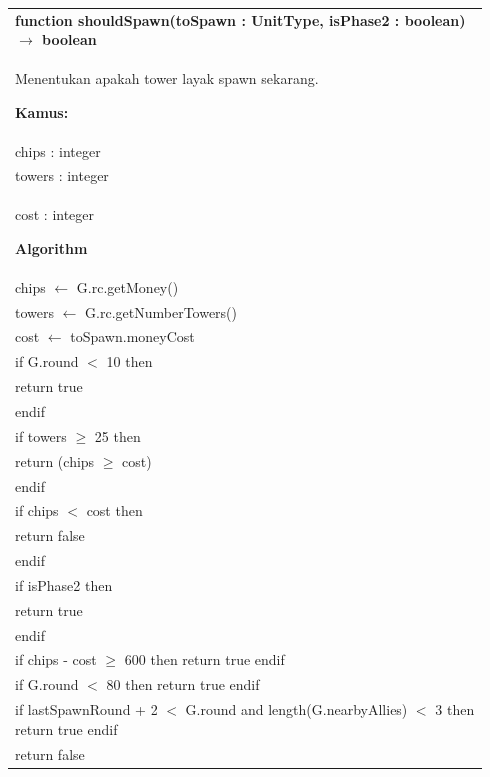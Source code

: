 \documentclass{article}
\newenvironment{pseudobox}
{
\centering
\begin{longtable}{|p{0.94\linewidth}|}
\hline
}
{
\\ \hline
\end{longtable}
\vspace{0.05cm}
}
\begin{document}
\begin{pseudobox}
\textbf{function shouldSpawn(toSpawn : UnitType, isPhase2 : boolean) $\rightarrow$ boolean} \\
{ Menentukan apakah tower layak spawn sekarang. }

\textbf{Kamus:} \\
\hspace*{1em} chips : integer \\
\hspace*{1em} towers : integer \\
\hspace*{1em} cost : integer

\textbf{Algorithm} \\
\hspace*{1em} chips $\leftarrow$ G.rc.getMoney() \\
\hspace*{1em} towers $\leftarrow$ G.rc.getNumberTowers() \\
\hspace*{1em} cost $\leftarrow$ toSpawn.moneyCost \\

\hspace*{1em} if G.round $<$ 10 then \\
\hspace*{2em} return true \\
\hspace*{1em} endif \\

\hspace*{1em} if towers $\geq$ 25 then \\
\hspace*{2em} return (chips $\geq$ cost) \\
\hspace*{1em} endif \\

\hspace*{1em} if chips $<$ cost then \\
\hspace*{2em} return false \\
\hspace*{1em} endif \\

\hspace*{1em} if isPhase2 then \\
\hspace*{2em} return true \\
\hspace*{1em} endif \\

\hspace*{1em} if chips - cost $\geq$ 600 then return true endif \\
\hspace*{1em} if G.round $<$ 80 then return true endif \\
\hspace*{1em} if lastSpawnRound + 2 $<$ G.round and length(G.nearbyAllies) $<$ 3 then return true endif \\

\hspace*{1em} return false
\end{pseudobox}
\end{document}

